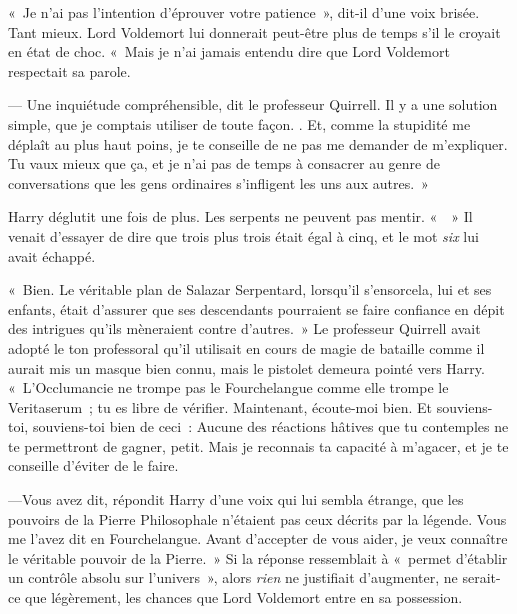 «~Je n'ai pas l'intention d'éprouver votre patience~», dit-il d'une voix brisée. Tant mieux. Lord Voldemort lui donnerait peut-être plus de temps s'il le croyait en état de choc. «~Mais je n'ai jamais entendu dire que Lord Voldemort respectait sa parole.

--- Une inquiétude compréhensible, dit le professeur Quirrell. Il y a une solution simple, que je comptais utiliser de toute façon. . Et, comme la stupidité me déplaît au plus haut poins, je te conseille de ne pas me demander de m'expliquer. Tu vaux mieux que ça, et je n'ai pas de temps à consacrer au genre de conversations que les gens ordinaires s'infligent les uns aux autres.~»

Harry déglutit une fois de plus. Les serpents ne peuvent pas mentir. «~~» Il venait d'essayer de dire que trois plus trois était égal à cinq, et le mot \emph{six} lui avait échappé.

«~Bien. Le véritable plan de Salazar Serpentard, lorsqu'il s'ensorcela, lui et ses enfants, était d'assurer que ses descendants pourraient se faire confiance en dépit des intrigues qu'ils mèneraient contre d'autres.~» Le professeur Quirrell avait adopté le ton professoral qu'il utilisait en cours de magie de bataille comme il aurait mis un masque bien connu, mais le pistolet demeura pointé vers Harry. «~L'Occlumancie ne trompe pas le Fourchelangue comme elle trompe le Veritaserum~; tu es libre de vérifier. Maintenant, écoute-moi bien.  Et souviens-toi, souviens-toi bien de ceci~:  Aucune des réactions hâtives que tu contemples ne te permettront de gagner, petit. Mais je reconnais ta capacité à m'agacer, et je te conseille d'éviter de le faire.

---Vous avez dit, répondit Harry d'une voix qui lui sembla étrange, que les pouvoirs de la Pierre Philosophale n'étaient pas ceux décrits par la légende. Vous me l'avez dit en Fourchelangue. Avant d'accepter de vous aider, je veux connaître le véritable pouvoir de la Pierre.~» Si la réponse ressemblait à «~permet d'établir un contrôle absolu sur l'univers~», alors \emph{rien} ne justifiait d'augmenter, ne serait-ce que légèrement, les chances que Lord Voldemort entre en sa possession.

